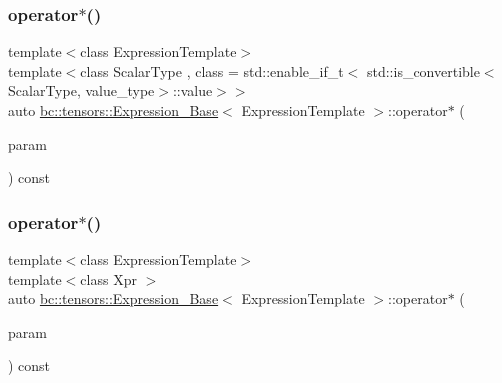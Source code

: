 \subsubsection{\texorpdfstring{operator$\ast$()}{operator*()}\hspace{0.1cm}{\footnotesize\ttfamily [1/2]}}
{\footnotesize\ttfamily template$<$class Expression\+Template$>$ \\
template$<$class Scalar\+Type , class  = std\+::enable\+\_\+if\+\_\+t$<$   std\+::is\+\_\+convertible$<$\+Scalar\+Type, value\+\_\+type$>$\+::value$>$$>$ \\
auto \hyperlink{classbc_1_1tensors_1_1Expression__Base}{bc\+::tensors\+::\+Expression\+\_\+\+Base}$<$ Expression\+Template $>$\+::operator$\ast$ (\begin{DoxyParamCaption}\item[{const Scalar\+Type \&}]{param }\end{DoxyParamCaption}) const\hspace{0.3cm}{\ttfamily [inline]}}

\mbox{\label{classbc_1_1tensors_1_1Expression__Base_a302938993699cd893b2d88cb6d570451}} 
\subsubsection{\texorpdfstring{operator$\ast$()}{operator*()}\hspace{0.1cm}{\footnotesize\ttfamily [2/2]}}
{\footnotesize\ttfamily template$<$class Expression\+Template$>$ \\
template$<$class Xpr $>$ \\
auto \hyperlink{classbc_1_1tensors_1_1Expression__Base}{bc\+::tensors\+::\+Expression\+\_\+\+Base}$<$ Expression\+Template $>$\+::operator$\ast$ (\begin{DoxyParamCaption}\item[{const \hyperlink{classbc_1_1tensors_1_1Expression__Base}{Expression\+\_\+\+Base}$<$ Xpr $>$ \&}]{param }\end{DoxyParamCaption}) const\hspace{0.3cm}{\ttfamily [inline]}}

\mbox{\label{classbc_1_1tensors_1_1Expression__Base_a3188044d69774275c9ba53b3cd6affc8}} 
